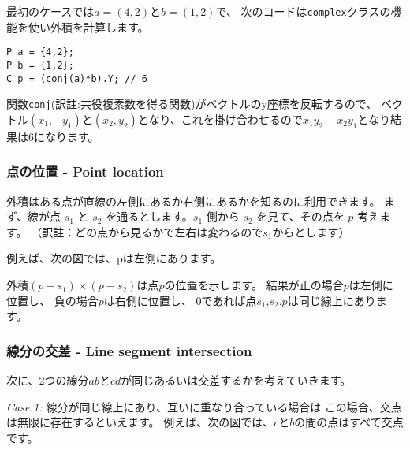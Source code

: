 \noindent
最初のケースでは$a=(4,2)$と$b=(1,2)$で、
次のコードは\texttt{complex}クラスの機能を使い外積を計算します。

\begin{lstlisting}
P a = {4,2};
P b = {1,2};
C p = (conj(a)*b).Y; // 6
\end{lstlisting}

関数\texttt{conj}(訳註:共役複素数を得る関数)がベクトルのy座標を反転するので、
ベクトル$(x_1,-y_1)$と$(x_2,y_2)$となり、これを掛け合わせるので$x_1 y_2 - x_2 y_1$となり結果は6になります。

\subsubsection{点の位置 - Point location}

外積はある点が直線の左側にあるか右側にあるかを知るのに利用できます。
まず、線が点 $s_1$ と $s_2$ を通るとします。$s_1$ 側から $s_2$ を見て、その点を $p$ 考えます。
（訳註：どの点から見るかで左右は変わるので$s_1$からとします）

例えば、次の図では、pは左側にあります。
\begin{center}
\end{center}

外積$(p-s_1) \times (p-s_2)$は点$p$の位置を示します。
結果が正の場合$p$は左側に位置し、
負の場合$p$は右側に位置し、
0であれば点$s_1$,$s_2$,$p$は同じ線上にあります。

\subsubsection{線分の交差 - Line segment intersection}


次に、2つの線分$ab$と$cd$が同じあるいは交差するかを考えていきます。

\textit{Case 1:}
線分が同じ線上にあり、互いに重なり合っている場合は
この場合、交点は無限に存在するといえます。
例えば、次の図では、$c$と$b$の間の点はすべて交点です。
\begin{center}
\end{center}


